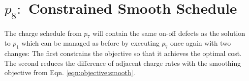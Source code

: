 \section{$p_8:$ Constrained Smooth Schedule\label{sec:constrainedSmoothSchedule}}
 \par The charge schedule from $p_7$ will contain the same on-off defects as the solution to $p_1$ which can be managed as before by executing $p_7$ once again with two changes: The first constrains the objective so that it achieves the optimal cost. The second reduces the difference of adjacent charge rates with the smoothing objective from Eqn. \ref{eqn:objective:smooth}.
\\[0.1in] 

